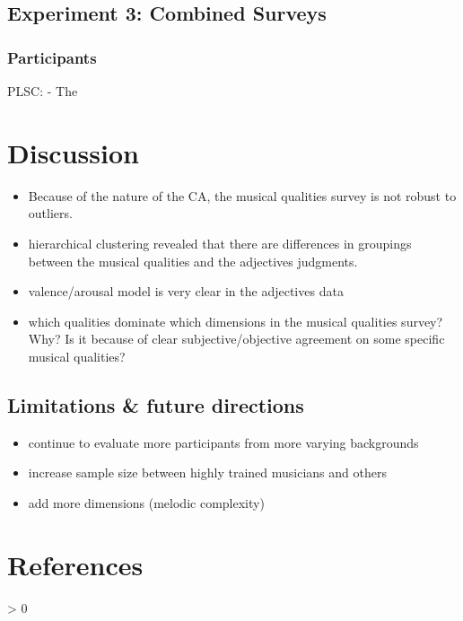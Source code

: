 \documentclass[
  english,
  man]{apa6}
\providecommand{\tightlist}{%
  \setlength{\itemsep}{0pt}\setlength{\parskip}{0pt}}
\newlength{\cslhangindent}
\newenvironment{CSLReferences}[2] %
 {%
  \setlength{\parindent}{0pt}
  \ifodd #1 \everypar{\setlength{\hangindent}{\cslhangindent}}\ignorespaces\fi
  \ifnum #2 > 0
  \setlength{\parskip}{#2\baselineskip}
  \fi
 }%
 {}
\begin{document}
\hypertarget{experiment-3-combined-surveys}{%
\subsection{Experiment 3: Combined Surveys}\label{experiment-3-combined-surveys}}

\hypertarget{participants-3}{%
\subsubsection{Participants}\label{participants-3}}

PLSC:
- The

\hypertarget{discussion}{%
\section{Discussion}\label{discussion}}

\begin{itemize}
\tightlist
\item
  Because of the nature of the CA, the musical qualities survey is not robust to outliers.
\item
  hierarchical clustering revealed that there are differences in groupings between the musical qualities and the adjectives judgments.
\item
  valence/arousal model is very clear in the adjectives data
\item
  which qualities dominate which dimensions in the musical qualities survey? Why? Is it because of clear subjective/objective agreement on some specific musical qualities?
\end{itemize}

\hypertarget{limitations-future-directions}{%
\subsection{Limitations \& future directions}\label{limitations-future-directions}}

\begin{itemize}
\tightlist
\item
  continue to evaluate more participants from more varying backgrounds
\item
  increase sample size between highly trained musicians and others
\item
  add more dimensions (melodic complexity)
\end{itemize}

\newpage

\hypertarget{references}{%
\section{References}\label{references}}

\begingroup
\setlength{\parindent}{-0.5in}
\setlength{\leftskip}{0.5in}

\hypertarget{refs}{}
\begin{CSLReferences}{0}{0}
\end{CSLReferences}

\endgroup
\end{document}
